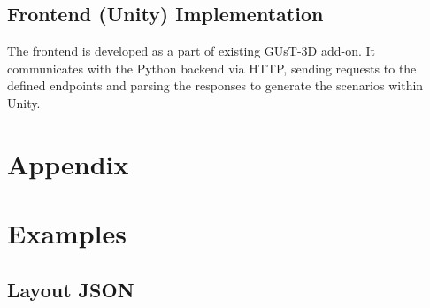 \documentclass{article}
\begin{document}
\subsection{Frontend (Unity) Implementation}

The frontend is developed as a part of existing GUsT-3D add-on. It communicates with the Python backend via HTTP, sending requests to the defined endpoints and parsing the responses to generate the scenarios within Unity. 

\section*{Appendix}

\section{Examples}

\subsection{Layout JSON}
\label{app:examples:example_json}
\end{document}
